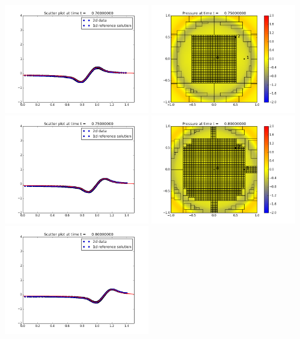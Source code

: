 \documentclass[11pt]{article}
\begin{document}
\includegraphics[width=0.475\textwidth]{frame0014fig3.png}
\vskip 10pt 
\includegraphics[width=0.475\textwidth]{frame0015fig0.png}
\includegraphics[width=0.475\textwidth]{frame0015fig3.png}
\vskip 10pt 
\includegraphics[width=0.475\textwidth]{frame0016fig0.png}
\includegraphics[width=0.475\textwidth]{frame0016fig3.png}
\end{document}
